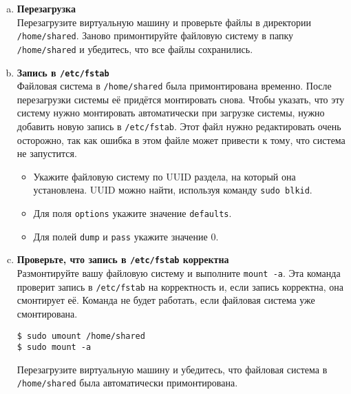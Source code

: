 \documentclass{article}
\begin{document}
\begin{enumerate}[a.]
\item \textbf{Перезагрузка}\\
Перезагрузите виртуальную машину и проверьте файлы в директории \texttt{/home/shared}.
Заново примонтируйте файловую систему в папку \texttt{/home/shared} и убедитесь, что все файлы сохранились.

\item \textbf{Запись в \texttt{/etc/fstab}}\\
Файловая система в \texttt{/home/shared} была примонтирована временно. После перезагрузки системы её придётся монтировать снова. Чтобы указать, что эту систему нужно монтировать автоматически при загрузке системы, нужно добавить новую запись в \texttt{/etc/fstab}. Этот файл нужно редактировать очень осторожно, так как ошибка в этом файле может привести к тому, что система не запустится.
\begin{itemize}
\item Укажите файловую систему по UUID раздела, на который она установлена. UUID можно найти, используя команду \texttt{sudo blkid}.
\item Для поля \texttt{options} укажите значение \texttt{defaults}.
\item Для полей \texttt{dump} и \texttt{pass} укажите значение 0.
\end{itemize}

\item \textbf{Проверьте, что запись в \texttt{/etc/fstab} корректна}\\
Размонтируйте вашу файловую систему и выполните \texttt{mount -a}. Эта команда проверит запись в \texttt{/etc/fstab} на корректность и, если запись корректна, она смонтирует её. Команда не будет работать, если файловая система уже смонтирована.
\begin{lstlisting}
$ sudo umount /home/shared
$ sudo mount -a
\end{lstlisting}
Перезагрузите виртуальную машину и убедитесь, что файловая система в \texttt{/home/shared} была автоматически примонтирована.

\end{enumerate}
\end{document}
